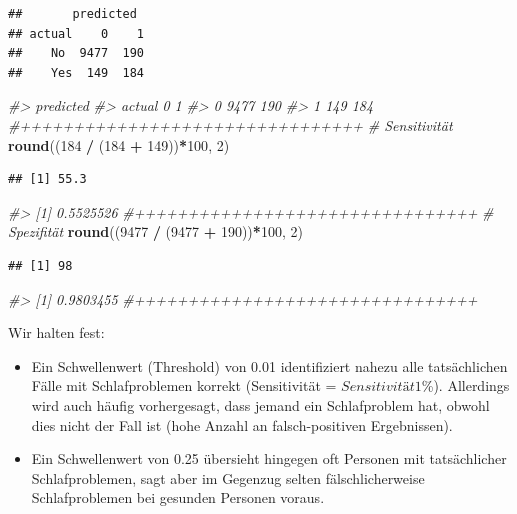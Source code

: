 \documentclass[
]{article}
\newenvironment{Shaded}{\begin{snugshade}}{\end{snugshade}}
\newcommand{\CommentTok}[1]{\textcolor[rgb]{0.56,0.35,0.01}{\textit{#1}}}
\newcommand{\DecValTok}[1]{\textcolor[rgb]{0.00,0.00,0.81}{#1}}
\newcommand{\FunctionTok}[1]{\textcolor[rgb]{0.13,0.29,0.53}{\textbf{#1}}}
\newcommand{\NormalTok}[1]{#1}
\newcommand{\SpecialCharTok}[1]{\textcolor[rgb]{0.81,0.36,0.00}{\textbf{#1}}}
\begin{document}
\begin{verbatim}
##       predicted
## actual    0    1
##    No  9477  190
##    Yes  149  184
\end{verbatim}

\begin{Shaded}
\begin{Highlighting}[]
  \CommentTok{\#\textgreater{}       predicted}
  \CommentTok{\#\textgreater{} actual    0    1}
  \CommentTok{\#\textgreater{}      0 9477  190}
  \CommentTok{\#\textgreater{}      1  149  184}
  \CommentTok{\#++++++++++++++++++++++++++++++++  }
  \CommentTok{\# Sensitivität}
  \FunctionTok{round}\NormalTok{((}\DecValTok{184} \SpecialCharTok{/}\NormalTok{ (}\DecValTok{184} \SpecialCharTok{+} \DecValTok{149}\NormalTok{))}\SpecialCharTok{*}\DecValTok{100}\NormalTok{, }\DecValTok{2}\NormalTok{)}
\end{Highlighting}
\end{Shaded}

\begin{verbatim}
## [1] 55.3
\end{verbatim}

\begin{Shaded}
\begin{Highlighting}[]
  \CommentTok{\#\textgreater{} [1] 0.5525526}
  \CommentTok{\#++++++++++++++++++++++++++++++++  }
  \CommentTok{\# Spezifität}
  \FunctionTok{round}\NormalTok{((}\DecValTok{9477} \SpecialCharTok{/}\NormalTok{ (}\DecValTok{9477} \SpecialCharTok{+} \DecValTok{190}\NormalTok{))}\SpecialCharTok{*}\DecValTok{100}\NormalTok{, }\DecValTok{2}\NormalTok{)}
\end{Highlighting}
\end{Shaded}

\begin{verbatim}
## [1] 98
\end{verbatim}

\begin{Shaded}
\begin{Highlighting}[]
  \CommentTok{\#\textgreater{} [1] 0.9803455}
  \CommentTok{\#++++++++++++++++++++++++++++++++}
\end{Highlighting}
\end{Shaded}

Wir halten fest:

\begin{itemize}
\item
  Ein Schwellenwert (Threshold) von 0.01 identifiziert nahezu alle tatsächlichen Fälle mit Schlafproblemen korrekt (Sensitivität = \(Sensitivität1\)\%). Allerdings wird auch häufig vorhergesagt, dass jemand ein Schlafproblem hat, obwohl dies nicht der Fall ist (hohe Anzahl an falsch-positiven Ergebnissen).
\item
  Ein Schwellenwert von 0.25 übersieht hingegen oft Personen mit tatsächlicher Schlafproblemen, sagt aber im Gegenzug selten fälschlicherweise Schlafproblemen bei gesunden Personen voraus.
\end{itemize}
\end{document}
